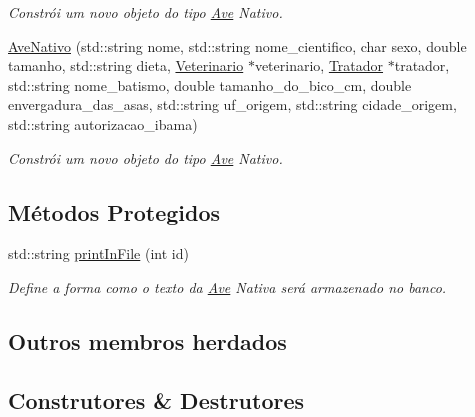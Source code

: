 \begin{DoxyCompactItemize}
\begin{DoxyCompactList}\small\item\em Constrói um novo objeto do tipo \hyperlink{classAve}{Ave} Nativo. \end{DoxyCompactList}\item 
\hyperlink{classAveNativo_a53fbea0153ec7680a1a6ab3611afc663}{Ave\+Nativo} (std\+::string nome, std\+::string nome\+\_\+cientifico, char sexo, double tamanho, std\+::string dieta, \hyperlink{classVeterinario}{Veterinario} $\ast$veterinario, \hyperlink{classTratador}{Tratador} $\ast$tratador, std\+::string nome\+\_\+batismo, double tamanho\+\_\+do\+\_\+bico\+\_\+cm, double envergadura\+\_\+das\+\_\+asas, std\+::string uf\+\_\+origem, std\+::string cidade\+\_\+origem, std\+::string autorizacao\+\_\+ibama)
\begin{DoxyCompactList}\small\item\em Constrói um novo objeto do tipo \hyperlink{classAve}{Ave} Nativo. \end{DoxyCompactList}\end{DoxyCompactItemize}
\subsection*{Métodos Protegidos}
\begin{DoxyCompactItemize}
\item 
std\+::string \hyperlink{classAveNativo_ab95679ed20354b2183706db24899d316}{print\+In\+File} (int id)
\begin{DoxyCompactList}\small\item\em Define a forma como o texto da \hyperlink{classAve}{Ave} Nativa será armazenado no banco. \end{DoxyCompactList}\end{DoxyCompactItemize}
\subsection*{Outros membros herdados}


\subsection{Construtores \& Destrutores}
\mbox{\label{classAveNativo_a5a51d97043dbf61f0c6ed91076242a42}} 
